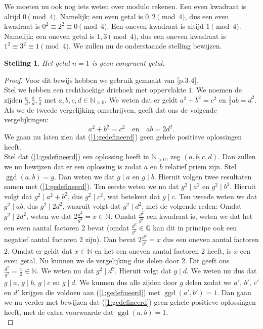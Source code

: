 \documentclass[12pt,reqno]{article}
\newcommand*{\NN}{\ensuremath{\mathbb{N}}}
\newcommand*{\QQ}{\ensuremath{\mathbb{Q}}}
\newcommand*{\NO}{\ensuremath{\mathbb{N}_{>0}}}
\theoremstyle{theorem}
\newtheorem{theorem}{Stelling}
\theoremstyle{definition}
\DeclareMathOperator{\ggd}{ggd}
\begin{document}
	We moeten nu ook nog iets weten over modulo rekenen. Een even kwadraat is altijd $0 \pmod{4}$. Namelijk; een even getal is $0,2 \pmod{4}$, dus een even kwadraat is $0^2 \equiv 2^2 \equiv 0 \pmod{4}$. Een oneven kwadraat is altijd $1 \pmod{4}$. Namelijk; een oneven getal is $1,3 \pmod{4}$, dus een oneven kwadraat is $1^2 \equiv 3^2 \equiv 1 \pmod{4}$. We zullen nu de onderstaande stelling bewijzen.
	\begin{theorem}
		Het getal $n=1$ is geen congruent getal.
	\end{theorem}
	\begin{proof}
		Voor dit bewijs hebben we gebruik gemaakt van \cite{Conrad}[p.3-4].\\
		Stel we hebben een rechthoekige driehoek met oppervlakte $1$. We noemen de zijden $\frac{a}{d}, \frac{b}{d}, \frac{c}{d}$ met $a,b,c,d\in\NO$. We weten dat er geldt $a^2 + b^2 = c ^2$ en $\frac{1}{2}ab = d^2$. Als we de tweede vergelijking omschrijven, geeft dat ons de volgende vergelijkingen:
		\begin{equation}\label{1:gedefineerd}
			a^2 + b^2 = c^2 \quad \text{en} \quad ab = 2d^2.
		\end{equation}
		We gaan nu laten zien dat (\ref{1:gedefineerd}) geen gehele positieve oplossingen heeft.\\
		
		Stel dat (\ref{1:gedefineerd}) een oplossing heeft in $\NO$, zeg $(a, b, c, d)$. Dan zullen we nu bewijzen dat er een oplossing is zodat $a$ en $b$ relatief priem zijn. Stel $\ggd(a,b) = g$. Dan weten we dat $g \mid a$ en $g \mid b$. Hieruit volgen twee resultaten samen met (\ref{1:gedefineerd}). Ten eerste weten we nu dat $g^2 \mid a^2$ en $g^2 \mid b^2$. Hieruit volgt dat $g^2 \mid a^2 + b^2$, dus $g^2 \mid c^2$, wat betekent dat $g \mid c$. Ten tweede weten we dat $g^2 \mid ab$, dus $g^2 \mid 2d^2$, waaruit volgt dat $g^2 \mid d^2$, met de volgende reden: Omdat $g^2 \mid 2d^2$, weten we dat $2\frac{d^2}{g^2} = x \in\NN$. Omdat $\frac{d^2}{g^2}$ een kwadraat is, weten we dat het een even aantal factoren $2$ bevat (omdat $\frac{d^2}{g^2}\in\QQ$ kan dit in principe ook een negatief aantal factoren 2 zijn). Dan bevat $2\frac{d^2}{g^2} = x$ dus een oneven aantal factoren $2$. Omdat er geldt dat $x \in\NN$ en het een oneven aantal factoren 2 heeft, is $x$ een even getal. Nu kunnen we de vergelijking dus delen door $2$. Dit geeft ons $\frac{d^2}{g^2}=\frac{x}{2} \in\NN$. We weten nu dat $g^2 \mid d^2$. Hieruit volgt dat $g \mid d$. We weten nu dus dat $g \mid a$, $g \mid b$, $g \mid c$ en $g \mid d$. We kunnen dus alle zijden door $g$ delen zodat we $a'$, $b'$, $c'$ en $d'$ krijgen die voldoen aan (\ref{1:gedefineerd}) met $\ggd(a',b') = 1$. Dan gaan we nu verder met bewijzen dat (\ref{1:gedefineerd}) geen gehele positieve oplossingen heeft, met de extra voorwaarde dat $\ggd(a,b) = 1$.\\
		

\end{proof}
\end{document}
